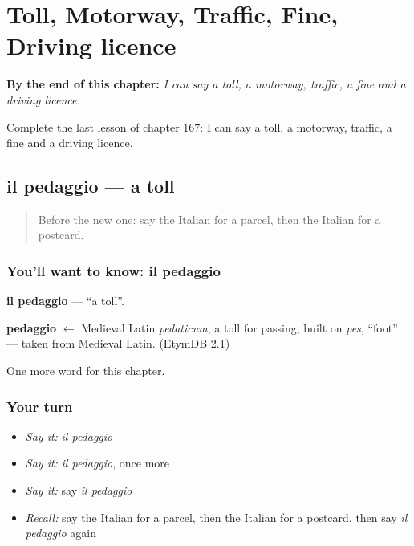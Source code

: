 
\chapter{Toll, Motorway, Traffic, Fine, Driving licence}
\label{ch:it-toll-motorway-traffic-fine-driving-licence}

\begin{chapteropening}
\textbf{By the end of this chapter:} \emph{I can say a toll, a motorway, traffic, a fine and a driving licence.}

Complete the last lesson of chapter 167: I can say a toll, a motorway, traffic, a fine and a driving licence.
\end{chapteropening}

\section[il pedaggio]{il pedaggio — a toll}

\label{lesson:IT-C167-pedaggio}



\begin{quote}
Before the new one: say the Italian for a parcel, then the Italian for a postcard.
\end{quote}

\subsection*{You'll want to know: il pedaggio}
\textbf{il pedaggio} — \textquotedblleft{}a toll\textquotedblright{}.

\begin{cousinweb}
\textbf{pedaggio} $\leftarrow$ Medieval Latin \emph{pedaticum}, a toll for passing, built on \emph{pes}, \textquotedblleft{}foot\textquotedblright{} — taken from Medieval Latin. (EtymDB 2.1)
\end{cousinweb}

\begin{grammarlens}[title={What you've built}]
One more word for this chapter.
\end{grammarlens}

\subsection*{Your turn}
\begin{itemize}
\raggedright
  \item \emph{Say it:} \emph{il pedaggio}
  \item \emph{Say it:} \emph{il pedaggio}, once more
  \item \emph{Say it:} say \emph{il pedaggio}
  \item \emph{Recall:} say the Italian for a parcel, then the Italian for a postcard, then say \emph{il pedaggio} again
\end{itemize}

